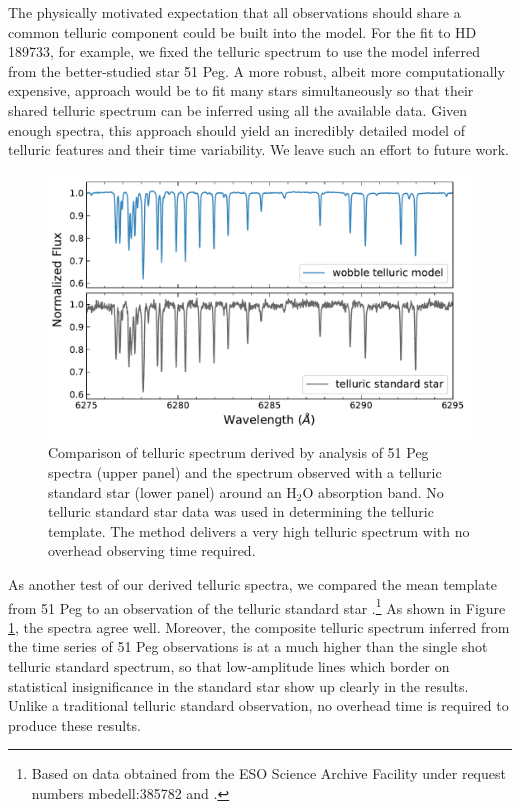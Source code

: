 \documentclass[modern]{aastex62}
\begin{document}
The physically motivated expectation that all observations should share a common telluric component could be built into the \wobble model.
For the fit to HD 189733, for example, we fixed the telluric spectrum to use the model inferred from the better-studied star 51 Peg.
A more robust, albeit more computationally expensive, approach would be to fit many stars simultaneously so that their shared telluric spectrum can be inferred using all the available data.
Given enough spectra, this approach should yield an incredibly detailed model of telluric features and their time variability.
We leave such an effort to future work.

\begin{figure}
\centering
\includegraphics[width=5in]{telluric_standard}
\caption{Comparison of telluric spectrum derived by \wobble analysis of 51 Peg spectra (upper panel) and the spectrum observed with a telluric standard star (lower panel) around an H$_2$O absorption band. No telluric standard star data was used in determining the \wobble telluric template. The \wobble method delivers a very high \SNR telluric spectrum with no overhead observing time required.}
\label{fig:telluric_standard}
\end{figure}

As another test of our derived telluric spectra, we compared the mean template from 51 Peg to an observation of the telluric standard star .\footnote{Based on data obtained from the ESO Science Archive Facility under request numbers mbedell:385782 and .}
As shown in Figure \ref{fig:telluric_standard}, the spectra agree well.
Moreover, the composite telluric spectrum inferred from the time series of 51 Peg observations is at a much higher \SNR than the single shot telluric standard spectrum, so that low-amplitude lines which border on statistical insignificance in the standard star show up clearly in the \wobble results.
Unlike a traditional telluric standard observation, no overhead time is required to produce these results.
\end{document}
